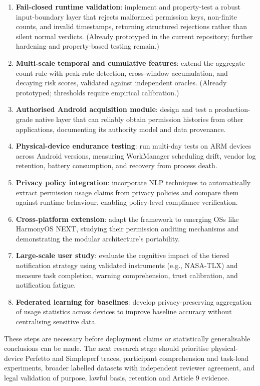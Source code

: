 \begin{enumerate}
    \item \textbf{Fail-closed runtime validation}: implement and property-test a robust input-boundary layer that rejects malformed permission keys, non-finite counts, and invalid timestamps, returning structured rejections rather than silent normal verdicts. (Already prototyped in the current repository; further hardening and property-based testing remain.)
    \item \textbf{Multi-scale temporal and cumulative features}: extend the aggregate-count rule with peak-rate detection, cross-window accumulation, and decaying risk scores, validated against independent oracles. (Already prototyped; thresholds require empirical calibration.)
    \item \textbf{Authorised Android acquisition module}: design and test a production-grade native layer that can reliably obtain permission histories from other applications, documenting its authority model and data provenance.
    \item \textbf{Physical-device endurance testing}: run multi-day tests on ARM devices across Android versions, measuring WorkManager scheduling drift, vendor log retention, battery consumption, and recovery from process death.
    \item \textbf{Privacy policy integration}: incorporate NLP techniques to automatically extract permission usage claims from privacy policies and compare them against runtime behaviour, enabling policy-level compliance verification.
    \item \textbf{Cross-platform extension}: adapt the framework to emerging OSs like HarmonyOS NEXT, studying their permission auditing mechanisms and demonstrating the modular architecture's portability.
    \item \textbf{Large-scale user study}: evaluate the cognitive impact of the tiered notification strategy using validated instruments (e.g., NASA-TLX) and measure task completion, warning comprehension, trust calibration, and notification fatigue.
    \item \textbf{Federated learning for baselines}: develop privacy-preserving aggregation of usage statistics across devices to improve baseline accuracy without centralising sensitive data.
\end{enumerate}

These steps are necessary before deployment claims or statistically generalisable conclusions can be made. The next research stage should prioritise physical-device Perfetto and Simpleperf traces, participant comprehension and task-load experiments, broader labelled datasets with independent reviewer agreement, and legal validation of purpose, lawful basis, retention and Article 9 evidence.

